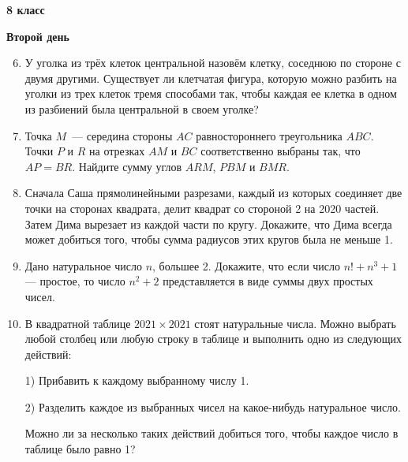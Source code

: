 \documentclass{article}
\begin{document}
\large
	
\begin{center}
	\LARGE\textbf{8 класс}
\end{center}
\begin{center}
	\large\textbf{Второй день}
\end{center}


\begin{enumerate}[label*=8.{\arabic{enumi}}]
\setcounter{enumi}{5}
\item У уголка из трёх клеток центральной назовём клетку, соседнюю по стороне с двумя другими. Существует ли клетчатая фигура, которую можно разбить на уголки из трех клеток тремя способами так, чтобы каждая ее клетка в одном из разбиений была центральной в своем уголке?
\item Точка $M$~--- середина стороны $AC$ равностороннего треугольника $ABC$. Точки $P$ и $R$ на отрезках $AM$ и $BC$ соответственно выбраны так, что $AP = BR$. Найдите сумму углов $ARM$, $PBM$ и $BMR$.
\item Сначала Саша прямолинейными разрезами, каждый из которых соединяет две точки на сторонах квадрата, делит квадрат со стороной 2 на 2020 частей. Затем Дима вырезает из каждой части по кругу. Докажите, что Дима всегда может добиться того, чтобы сумма радиусов этих кругов была не меньше 1.
\item Дано натуральное число $n$, большее 2. Докажите, что если число $n!+n^3+1$ — простое, то число $n^2+2$ представляется в виде суммы двух простых чисел.
\item В квадратной таблице $2021 \times 2021$ стоят натуральные числа. Можно выбрать любой столбец или любую строку в таблице и выполнить одно из следующих действий: 

1) Прибавить к каждому выбранному числу 1. 

2) Разделить каждое из выбранных чисел на какое-нибудь натуральное число. 

Можно ли за несколько таких действий добиться того, чтобы каждое число в таблице было равно 1?

\end{enumerate}
\end{document}
